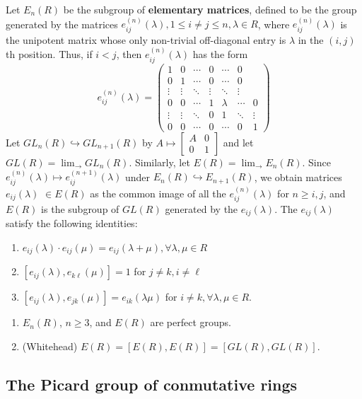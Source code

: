 Let $E_n(R)$ be the subgroup of \textbf{elementary matrices}, defined to be the group generated by the matrices $e_{i j}^{(n)}(\lambda), 1 \leq i \neq j \leq n, \lambda \in R$, where $e_{i j}^{(n)}(\lambda)$ is the unipotent matrix whose only non-trivial off-diagonal entry is $\lambda$ in the $(i, j)$ th position. Thus, if $i<j$, then $e_{i j}^{(n)}(\lambda)$ has the form 
\[
e_{ij}^{(n)}(\lambda) =
\begin{pmatrix}
1 & 0 & \cdots & 0 & \cdots & 0 \\
0 & 1 & \cdots & 0 & \cdots & 0 \\
\vdots & \vdots & \ddots & \vdots & \ddots & \vdots \\
0 & 0 & \cdots & 1 & \lambda & \cdots & 0 \\
\vdots & \vdots & \ddots & 0 & 1 & \ddots & \vdots \\
0 & 0 & \cdots & 0 & \cdots & 0 & 1
\end{pmatrix}
\]
Let $G L_n(R) \hookrightarrow G L_{n+1}(R)$ by
$
A \longmapsto\left[\begin{array}{ll}
A & 0 \\
0 & 1
\end{array}\right]
$
and let $G L(R)=\lim _{\rightarrow} G L_n(R)$. Similarly, let $E(R)=\lim _{\rightarrow} E_n(R)$. Since $e_{i j}^{(n)}(\lambda) \longmapsto e_{i j}^{(n+1)}(\lambda)$ under $E_n(R) \hookrightarrow E_{n+1}(R)$, we obtain matrices $e_{i j}(\lambda)$ $\in E(R)$ as the common image of all the $e_{i j}^{(n)}(\lambda)$ for $n \geq i, j$, and $E(R)$ is the subgroup of $G L(R)$ generated by the $e_{i j}(\lambda)$. The $e_{i j}(\lambda)$ satisfy the following identities:
\begin{enumerate}
    \item $e_{i j}(\lambda) \cdot e_{i j}(\mu)=e_{i j}(\lambda+\mu), \forall \lambda, \mu \in R$
    \item $\left[e_{i j}(\lambda), e_{k \ell}(\mu)\right]=1$ for $j \neq k, i \neq \ell$
    \item $\left[e_{i j}(\lambda), e_{j k}(\mu)\right]=e_{i k}(\lambda \mu)$ for $i \neq k, \forall \lambda, \mu \in R$.
\end{enumerate}

\begin{lemm}
    \begin{enumerate}
        \item $E_n(R)$, $n \geq 3$, and $E(R)$ are perfect groups.
        \item (Whitehead) $E(R)=[E(R), E(R)]=[G L(R), G L(R)]$.
    \end{enumerate}
\end{lemm}

\subsection{The Picard group of conmutative rings}

